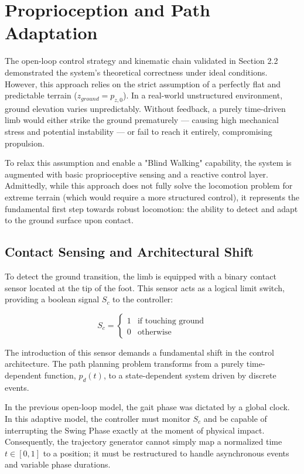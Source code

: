 \section{Proprioception and Path Adaptation}
\label{sec:proprioception}

The open-loop control strategy and kinematic chain validated in Section 2.2 demonstrated the system's theoretical
correctness under ideal conditions. However, this approach relies on the strict assumption of a perfectly flat
and predictable terrain ($z_{ground} = p_{z,0}$). In a real-world unstructured environment, ground elevation
varies unpredictably. Without feedback, a purely time-driven limb would either strike the ground prematurely
— causing high mechanical stress and potential instability — or fail to reach it entirely, compromising propulsion.

To relax this assumption and enable a "Blind Walking" \cite{brooks1989robot} capability, the system is
augmented with basic proprioceptive sensing and a reactive control layer. Admittedly, while this approach does
not fully solve the locomotion problem for extreme terrain (which would require a more structured control), it
represents the fundamental first step towards robust locomotion: the ability to detect and adapt to the ground
surface upon contact.


\subsection{Contact Sensing and Architectural Shift}

To detect the ground transition, the limb is equipped with a binary contact sensor located at the tip of the
foot. This sensor acts as a logical limit switch, providing a boolean signal $S_c$ to the controller:

$$
  S_c =
  \begin{cases}
    1 & \text{if touching ground}\\
    0 & \text{otherwise}
  \end{cases}
$$

The introduction of this sensor demands a fundamental shift in the control architecture. The path planning
problem transforms from a purely time-dependent function, $p_d(t)$, to a state-dependent system driven by
discrete events.

In the previous open-loop model, the gait phase was dictated by a global clock. In this adaptive model, the
controller must monitor $S_c$ and be capable of interrupting the Swing Phase exactly at the moment of
physical impact. Consequently, the trajectory generator cannot simply map a normalized time $t \in [0,1]$ to a
position; it must be restructured to handle asynchronous events and variable phase durations.


